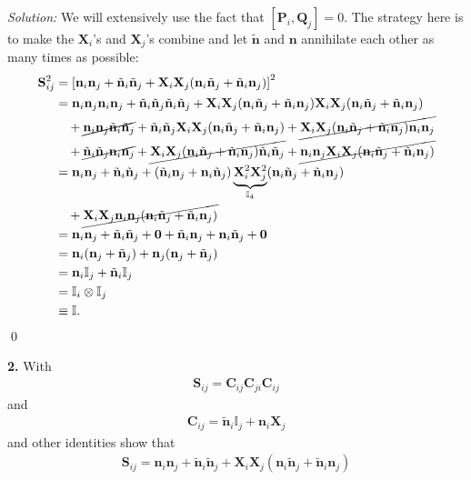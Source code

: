 \documentclass{book}
\theoremstyle{definition}
\newcommand{\nn}{\nonumber}
\newcommand{\n}{\mathbf{n}}
\newcommand{\X}{\mathbf{X}}
\newcommand{\lb}{\left[}
\newcommand{\rb}{\right]}
\newcommand{\Id}{\mathbb{I}}
\begin{document}
\noindent \textit{Solution:} We will extensively use the fact that $[\mathbf{P}_i,\mathbf{Q}_j] = 0$. The strategy here is to make the $\X_i$'s and $\X_j$'s combine and let $\tilde{\n}$ and $\n$ annihilate each other as many times as possible:
\begin{align}
\mathbf{S}_{ij}^2 &= \lb \n_i\n_j + \tilde{\mathbf{\n}}_i \tilde{\mathbf{\n}}_j + \X_i\X_j(\n_i\tilde{\mathbf{n}}_j + \tilde{\mathbf{n}}_i \n_j) \rb^2\nn\\
&= \n_i\n_j\n_i\n_j + \tilde{\mathbf{\n}}_i \tilde{\mathbf{\n}}_j\tilde{\mathbf{\n}}_i \tilde{\mathbf{\n}}_j + \X_i\X_j(\n_i\tilde{\mathbf{n}}_j + \tilde{\mathbf{n}}_i \n_j)\X_i\X_j(\n_i\tilde{\mathbf{n}}_j + \tilde{\mathbf{n}}_i \n_j) \nn\\
&\quad +\cancel{\n_i\n_j\tilde{\mathbf{\n}}_i \tilde{\mathbf{\n}}_j} + {\tilde{\mathbf{\n}}_i \tilde{\mathbf{\n}}_j\X_i\X_j(\n_i\tilde{\mathbf{n}}_j + \tilde{\mathbf{n}}_i \n_j)} + \cancel{\X_i\X_j(\n_i\tilde{\mathbf{n}}_j + \tilde{\mathbf{n}}_i \n_j)\n_i\n_j} \nn\\
&\quad +\cancel{\tilde{\mathbf{\n}}_i \tilde{\mathbf{\n}}_j\n_i\n_j} + \cancel{\X_i\X_j(\n_i\tilde{\mathbf{n}}_j + \tilde{\mathbf{n}}_i \n_j)\tilde{\mathbf{\n}}_i \tilde{\mathbf{\n}}_j} + \cancel{\n_i\n_j\X_i\X_j(\n_i\tilde{\mathbf{n}}_j + \tilde{\mathbf{n}}_i \n_j)}\nn\\
&= \n_i \n_j + \tilde{\n}_i\tilde{\n}_j +  (\tilde{\n}_i\n_j+\n_i\tilde{\n}_j)\underbrace{\X_i^2\X_j^2}_{\Id_4}(\n_i\tilde{\n}_j+\tilde{\n}_i\n_j) \nn\\ &\quad +\cancel{\X_i\X_j\n_i\n_j(\n_i\tilde{\mathbf{n}}_j + \tilde{\mathbf{n}}_i \n_j)}\nn\\
&= \n_i \n_j + \tilde{\n}_i\tilde{\n}_j + \mathbf{0} + \tilde{\n}_i\n_j + \n_i\tilde{\n}_j + \mathbf{0}\nn\\
&= \n_i(\n_j+ \tilde{\n}_j) + \n_j(\n_j + \tilde{\n}_j)\nn\\
&= \n_i\Id_j + \tilde{\n}_i \Id_j \nn\\
&= \Id_i \otimes \Id_j \nn\\
&\equiv \Id.
\end{align}
\qed



\newpage





\noindent \textbf{2.} With
\begin{align}
\mathbf{S}_{ij} = \mathbf{C}_{ij}\mathbf{C}_{ji}\mathbf{C}_{ij}
\end{align}
and 
\begin{align}
\mathbf{C}_{ij} = \tilde{\n}_i\Id_j + \n_i \X_j
\end{align}
and other identities show that
\begin{align}
\mathbf{S}_{ij} = \n_i\n_j + \tilde{\mathbf{\n}}_i \tilde{\mathbf{\n}}_j + \X_i\X_j(\n_i\tilde{\mathbf{n}}_j + \tilde{\mathbf{n}}_i \n_j)
\end{align}
\end{document}
